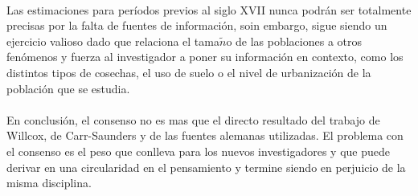 \documentclass[11pt,spanish,letterpaper]{article}
\theoremstyle{plain}
\begin{document}
\\
Las estimaciones para per\'iodos previos al siglo XVII nunca podr\'an ser totalmente precisas por la falta de fuentes de informaci\'on, soin embargo, sigue siendo un ejercicio valioso dado que relaciona el tama$\tilde{n}$o de las poblaciones a otros fen\'omenos y fuerza al investigador a poner su informaci\'on en contexto, como los distintos tipos de cosechas, el uso de suelo o el nivel de urbanizaci\'on de la poblaci\'on que se estudia.\\
\\
En conclusi\'on, el consenso no es mas que el directo resultado del trabajo de Willcox, de Carr-Saunders y de las fuentes alemanas utilizadas. El problema con el consenso es el peso que conlleva para los nuevos investigadores y que puede derivar en una circularidad en el pensamiento y termine siendo en perjuicio de la misma disciplina.


\end{document}
